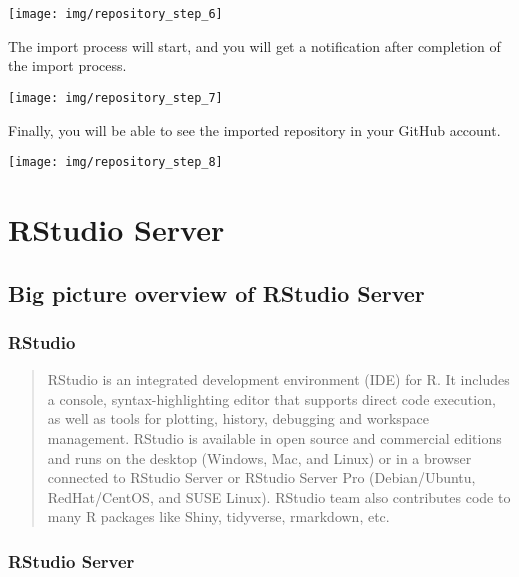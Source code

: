 \documentclass[
]{book}
\begin{document}
\begin{center}\texttt{[image: img/repository\_step\_6]} \end{center}

The import process will start, and you will get a notification after completion of the import process.

\begin{center}\texttt{[image: img/repository\_step\_7]} \end{center}

Finally, you will be able to see the imported repository in your GitHub account.

\begin{center}\texttt{[image: img/repository\_step\_8]} \end{center}

\hypertarget{rstudio-server}{%
\chapter{RStudio Server}\label{rstudio-server}}

\hypertarget{big-picture-overview-of-rstudio-server}{%
\section{Big picture overview of RStudio Server}\label{big-picture-overview-of-rstudio-server}}

\hypertarget{rstudio}{%
\subsection{RStudio}\label{rstudio}}

\begin{quote}
RStudio is an integrated development environment (IDE) for R. It includes a console, syntax-highlighting editor that supports direct code execution, as well as tools for plotting, history, debugging and workspace management. RStudio is available in open source and commercial editions and runs on the desktop (Windows, Mac, and Linux) or in a browser connected to RStudio Server or RStudio Server Pro (Debian/Ubuntu, RedHat/CentOS, and SUSE Linux). RStudio team also contributes code to many R packages like Shiny, tidyverse, rmarkdown, etc.
\end{quote}

\hypertarget{rstudio-server-1}{%
\subsection{RStudio Server}\label{rstudio-server-1}}
\end{document}
